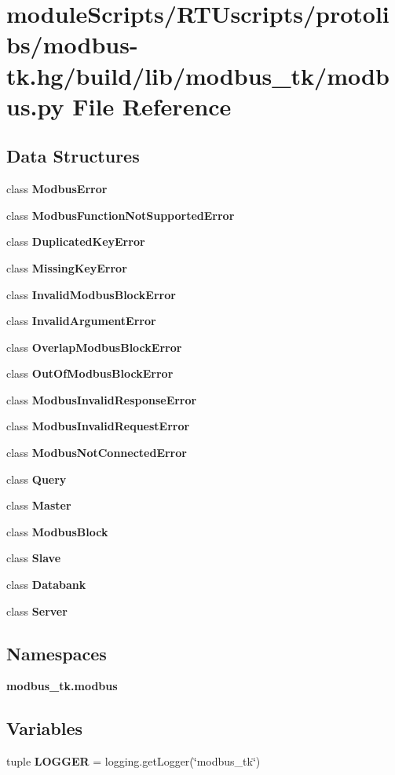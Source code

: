 \section{module\+Scripts/\+R\+T\+Uscripts/protolibs/modbus-\/tk.hg/build/lib/modbus\+\_\+tk/modbus.py File Reference}
\label{modbus-tk_8hg_2build_2lib_2modbus__tk_2modbus_8py}
\subsection*{Data Structures}
\begin{DoxyCompactItemize}
\item 
class {\bf Modbus\+Error}
\item 
class {\bf Modbus\+Function\+Not\+Supported\+Error}
\item 
class {\bf Duplicated\+Key\+Error}
\item 
class {\bf Missing\+Key\+Error}
\item 
class {\bf Invalid\+Modbus\+Block\+Error}
\item 
class {\bf Invalid\+Argument\+Error}
\item 
class {\bf Overlap\+Modbus\+Block\+Error}
\item 
class {\bf Out\+Of\+Modbus\+Block\+Error}
\item 
class {\bf Modbus\+Invalid\+Response\+Error}
\item 
class {\bf Modbus\+Invalid\+Request\+Error}
\item 
class {\bf Modbus\+Not\+Connected\+Error}
\item 
class {\bf Query}
\item 
class {\bf Master}
\item 
class {\bf Modbus\+Block}
\item 
class {\bf Slave}
\item 
class {\bf Databank}
\item 
class {\bf Server}
\end{DoxyCompactItemize}
\subsection*{Namespaces}
\begin{DoxyCompactItemize}
\item 
 {\bf modbus\+\_\+tk.\+modbus}
\end{DoxyCompactItemize}
\subsection*{Variables}
\begin{DoxyCompactItemize}
\item 
tuple {\bf L\+O\+G\+G\+E\+R} = logging.\+get\+Logger(\char`\"{}modbus\+\_\+tk\char`\"{})
\end{DoxyCompactItemize}

